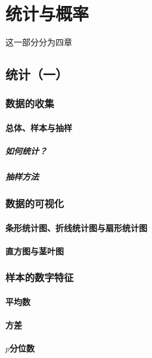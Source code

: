 \part{统计与概率}
这一部分分为四章
\chapter{统计（一）}


\section{数据的收集}
\subsection{总体、样本与抽样}
\clearpage
\subsubsection{如何统计？}
\clearpage
\subsubsection{抽样方法}
\clearpage


\section{数据的可视化}
\subsection{条形统计图、折线统计图与扇形统计图}
\clearpage
\subsection{直方图与茎叶图}
\clearpage


\section{样本的数字特征}
\subsection{平均数}
\clearpage
\subsection{方差}
\clearpage
\subsection{\texorpdfstring{$p$}a分位数}
\clearpage
